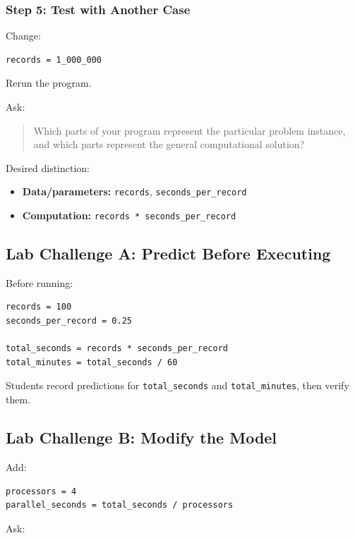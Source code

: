 \documentclass[11pt]{article}
\begin{document}
\subsubsection*{Step 5: Test with Another Case}

Change:

\begin{lstlisting}
records = 1_000_000
\end{lstlisting}

Rerun the program.

Ask:

\begin{quote}
Which parts of your program represent the particular problem instance, and which parts represent the general computational solution?
\end{quote}

Desired distinction:

\begin{itemize}
    \item \textbf{Data/parameters:} \texttt{records}, \texttt{seconds\_per\_record}
    \item \textbf{Computation:} \texttt{records * seconds\_per\_record}
\end{itemize}

\subsection*{Lab Challenge A: Predict Before Executing}

Before running:

\begin{lstlisting}
records = 100
seconds_per_record = 0.25

total_seconds = records * seconds_per_record
total_minutes = total_seconds / 60
\end{lstlisting}

Students record predictions for \texttt{total\_seconds} and \texttt{total\_minutes}, then verify them.

\subsection*{Lab Challenge B: Modify the Model}

Add:

\begin{lstlisting}
processors = 4
parallel_seconds = total_seconds / processors
\end{lstlisting}

Ask:
\end{document}
